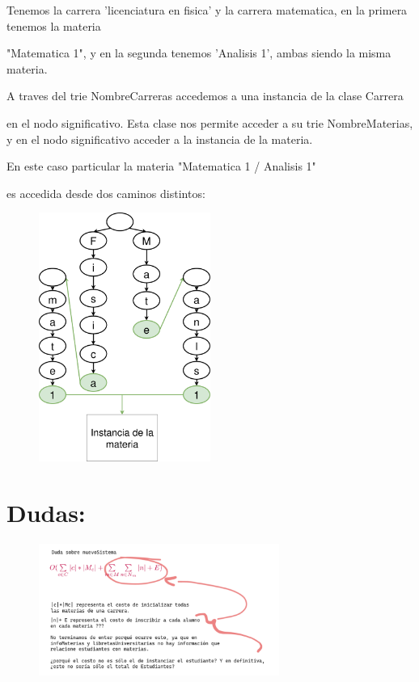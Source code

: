 \documentclass[a4paper,10pt]{article}
\begin{document}
Tenemos la carrera 'licenciatura en fisica' y la carrera matematica, en la primera tenemos la materia

"Matematica 1", y en la segunda tenemos 'Analisis 1', ambas siendo la misma materia.

A traves del trie NombreCarreras accedemos a una instancia de la clase Carrera

en el nodo significativo. Esta clase nos permite acceder a su trie NombreMaterias, y en el nodo significativo acceder a la instancia de la materia.



\pagebreak
En este caso particular la materia "Matematica 1 / Analisis 1"

es accedida desde dos caminos distintos:
\salto{\baselineskip}
\begin{figure}[h]
    \centering
    \includegraphics[width=0.5\textwidth]{diagrama1.png}
\end{figure}
\pagebreak
\section*{Dudas:}
\begin{figure}[h]
    \centering
    \includegraphics[width=0.7\textwidth]{duda1.png}
\end{figure}
\pagebreak
\end{document}
